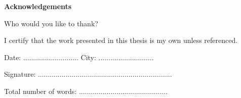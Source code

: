 \vspace*{\fill}

\vspace{1cm}
\begin{flushleft}

\large
\textbf{Acknowledgements}

Who would you like to thank? 
    

\vspace{1cm}

I certify that the work presented in this thesis is my own unless referenced.


\vspace{0.5cm}

Date: ............................
\hspace{1cm} 
City: ............................ 

\vspace{0.5cm}
Signature: ....................................................................

\vspace{0.5cm}
Total number of words: .............................................

\end{flushleft}

\vspace*{\fill}
\pagebreak